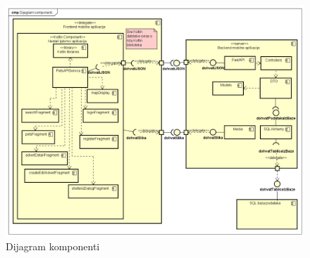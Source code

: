 			\begin{figure}[H]
				\includegraphics[scale=0.48]{dijagrami/dijagramKomponenti/dKomponenti.PNG} %
				\centering
				\caption{Dijagram komponenti}
				\label{fig:dKomponenti}
			\end{figure}
